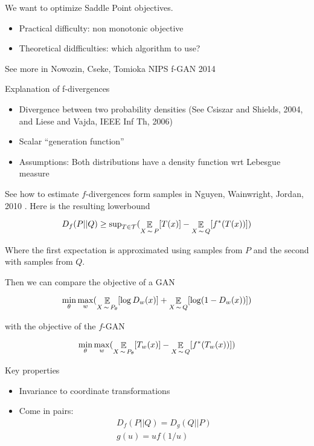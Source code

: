 We want to optimize Saddle Point objectives.

\begin{itemize}
  \item Practical difficulty: non monotonic objective
  \item Theoretical didfficulties: which algorithm to use?
\end{itemize}


See more in Nowozin, Cseke, Tomioka NIPS f-GAN 2014 \cite{nowozin2016f}

Explanation of f-divergences

\begin{itemize}
  \item Divergence between two probability densities (See Csiszar and Shields,
    2004, and Liese and Vajda, IEEE Inf Th, 2006)
  \item Scalar ``generation function''
  \item Assumptions: Both distributions have a density function wrt Lebesgue
    measure
\end{itemize}

See how to estimate $f$-divergences form samples in Nguyen, Wainwright, Jordan,
2010 \cite{nguyen2010estimating}. Here is the resulting lowerbound

\begin{equation}
  D_f(P||Q) \ge \text{sup}_{T \in \mathcal{T}}( \operatorname*{\mathbb{\mathop{E}}}_{X\operatorname*{\sim} P}[T(x)] - \operatorname*{\mathbb{\mathop{E}}}_{X\operatorname*{\sim} Q}[f^*(T(x))])
\end{equation}

Where the first expectation is approximated using samples from $P$ and the
second with samples from $Q$.

Then we can compare the objective of a GAN

\begin{equation}
  \min_\theta \max_w ( \operatorname*{\mathbb{\mathop{E}}}_{X\operatorname*{\sim} P_\theta}[\log D_w(x)] + \operatorname*{\mathbb{\mathop{E}}}_{X\operatorname*{\sim}
  Q}[\log (1-D_w(x))])
\end{equation}

with the objective of the $f$-GAN

\begin{equation}
  \min_\theta \max_w ( \operatorname*{\mathbb{\mathop{E}}}_{X\operatorname*{\sim} P_\theta}[T_w(x)] - \operatorname*{\mathbb{\mathop{E}}}_{X\operatorname*{\sim}
  Q}[f^*(T_w(x))])
\end{equation}

Key properties

\begin{itemize}
  \item Invariance to coordinate transformations
  \item Come in pairs:
    \begin{align}
      D_f(P||Q) = D_g(Q||P) \\
      g(u) = uf(1/u)
    \end{align}
\end{itemize}

